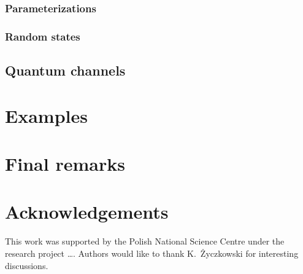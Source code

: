 \documentclass[11pt,a4paper]{article}
\begin{document}
\subsubsection{Parameterizations}

\subsubsection{Random states}

\subsection{Quantum channels}

\section{Examples}

\section{Final remarks}

\section{Acknowledgements}
This work was supported by the Polish National Science Centre under the research
project \dots. Authors would like to thank K.~\.Zyczkowski for interesting
discussions.
\end{document}
